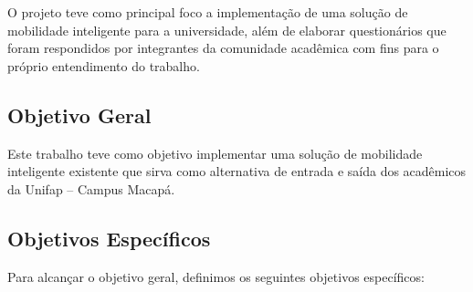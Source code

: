O projeto teve como principal foco a implementação de uma solução de mobilidade inteligente para a universidade, além de elaborar questionários que foram respondidos por integrantes da comunidade acadêmica com fins para o próprio entendimento do trabalho. 

\subsection{Objetivo Geral}
Este trabalho teve como objetivo implementar uma solução de mobilidade inteligente existente que sirva como alternativa de entrada e saída dos acadêmicos da Unifap -- Campus Macapá.

\begin{comment}
Este trabalho tem como objetivo principal o estudo sobre Mobilidade Inteligente
considerando o contexto de mobilidade relacionado à Universidade Federal do Amapá
e realizar o debate sobre a viabilidade de utilização pela comunidade acadêmica em geral (docentes, discentes e técnicos) de soluções tecnológicas existentes, visando oferecer alternativa(s) de transporte que dê acesso e diminua problemas diários enfrentados para chegar e/ou sair da universidade.
\end{comment}

\subsection{Objetivos Específicos}

Para alcançar o objetivo geral, definimos os seguintes objetivos específicos:

